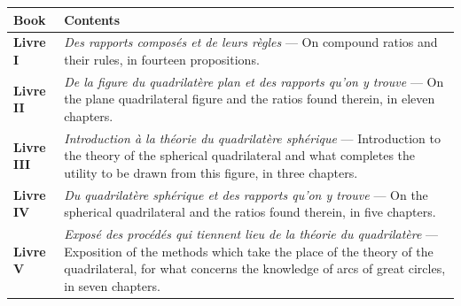 \documentclass[11pt,a4paper]{article}
\theoremstyle{plain}
\theoremstyle{definition}
\theoremstyle{remark}
\begin{document}
\begin{center}

\begin{longtable}{lp{10cm}}

\toprule

\textbf{Book} & \textbf{Contents} \\

\midrule

\endhead



\textbf{Livre I} & \textit{Des rapports composés et de leurs règles} --- On compound ratios and their rules, in fourteen propositions. \\

\addlinespace[0.3cm]



\textbf{Livre II} & \textit{De la figure du quadrilatère plan et des rapports qu'on y trouve} --- On the plane quadrilateral figure and the ratios found therein, in eleven chapters. \\

\addlinespace[0.3cm]



\textbf{Livre III} & \textit{Introduction à la théorie du quadrilatère sphérique} --- Introduction to the theory of the spherical quadrilateral and what completes the utility to be drawn from this figure, in three chapters. \\

\addlinespace[0.3cm]



\textbf{Livre IV} & \textit{Du quadrilatère sphérique et des rapports qu'on y trouve} --- On the spherical quadrilateral and the ratios found therein, in five chapters. \\

\addlinespace[0.3cm]



\textbf{Livre V} & \textit{Exposé des procédés qui tiennent lieu de la théorie du quadrilatère} --- Exposition of the methods which take the place of the theory of the quadrilateral, for what concerns the knowledge of arcs of great circles, in seven chapters. \\

\bottomrule

\end{longtable}

\end{center}
\end{document}
